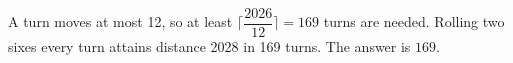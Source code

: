A turn moves at most 12, so at least $\lceil \dfrac{2026}{12} \rceil = 169$ turns are needed. Rolling two sixes every turn attains distance 2028 in 169 turns. The answer is $\boxed{169}$.
